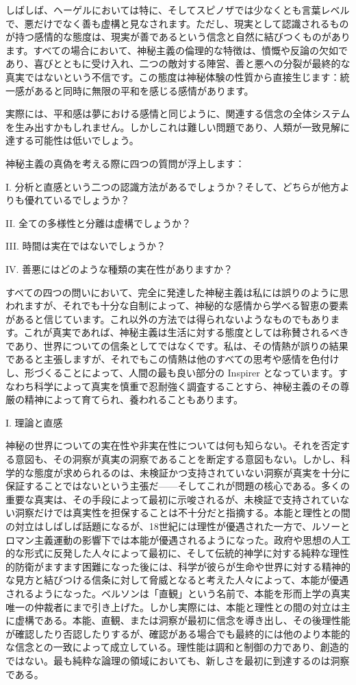 \documentclass[a4paper,11pt,openany]{ltjsbook}
\begin{document}
しばしば、ヘーゲルにおいては特に、そしてスピノザでは少なくとも言葉レベルで、悪だけでなく善も虚構と見なされます。ただし、現実として認識されるものが持つ感情的な態度は、現実が善であるという信念と自然に結びつくものがあります。すべての場合において、神秘主義の倫理的な特徴は、憤慨や反論の欠如であり、喜びとともに受け入れ、二つの敵対する陣営、善と悪への分裂が最終的な真実ではないという不信です。この態度は神秘体験の性質から直接生じます：統一感があると同時に無限の平和を感じる感情があります。

実際には、平和感は夢における感情と同じように、関連する信念の全体システムを生み出すかもしれません。しかしこれは難しい問題であり、人類が一致見解に達する可能性は低いでしょう。

神秘主義の真偽を考える際に四つの質問が浮上します：

  I. 分析と直感という二つの認識方法があるでしょうか？そして、どちらが他方よりも優れているでしょうか？

  II. 全ての多様性と分離は虚構でしょうか？

  III. 時間は実在ではないでしょうか？

  IV. 善悪にはどのような種類の実在性がありますか？

すべての四つの問いにおいて、完全に発達した神秘主義は私には誤りのように思われますが、それでも十分な自制によって、神秘的な感情から学べる智恵の要素があると信じています。これ以外の方法では得られないようなものでもあります。これが真実であれば、神秘主義は生活に対する態度としては称賛されるべきであり、世界についての信条としてではなくです。私は、その情熱が誤りの結果であると主張しますが、それでもこの情熱は他のすべての思考や感情を色付けし、形づくることによって、人間の最も良い部分の Inspirer となっています。すなわち科学によって真実を慎重で忍耐強く調査することすら、神秘主義のその尊厳の精神によって育てられ、養われることもあります。

I. 理論と直感

神秘の世界についての実在性や非実在性については何も知らない。それを否定する意図も、その洞察が真実の洞察であることを断定する意図もない。しかし、科学的な態度が求められるのは、未検証かつ支持されていない洞察が真実を十分に保証することではないという主張だ——そしてこれが問題の核心である。多くの重要な真実は、その手段によって最初に示唆されるが、未検証で支持されていない洞察だけでは真実性を担保することは不十分だと指摘する。本能と理性との間の対立はしばしば話題になるが、18世紀には理性が優遇された一方で、ルソーとロマン主義運動の影響下では本能が優遇されるようになった。政府や思想の人工的な形式に反発した人々によって最初に、そして伝統的神学に対する純粋な理性的防衛がますます困難になった後には、科学が彼らが生命や世界に対する精神的な見方と結びつける信条に対して脅威となると考えた人々によって、本能が優遇されるようになった。ベルソンは「直観」という名前で、本能を形而上学の真実唯一の仲裁者にまで引き上げた。しかし実際には、本能と理性との間の対立は主に虚構である。本能、直観、または洞察が最初に信念を導き出し、その後理性能が確認したり否認したりするが、確認がある場合でも最終的には他のより本能的な信念との一致によって成立している。理性能は調和と制御の力であり、創造的ではない。最も純粋な論理の領域においても、新しさを最初に到達するのは洞察である。
\end{document}
